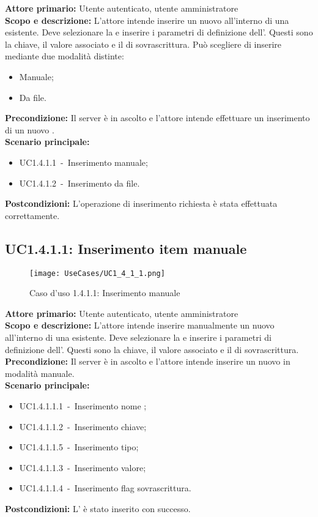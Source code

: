 \documentclass{scalatekids-article}
\begin{document}
\textbf{Attore primario:} Utente autenticato, utente amministratore\\
\textbf{Scopo e descrizione:} L'attore intende inserire un nuovo  all'interno di una  esistente. Deve selezionare la  e inserire i parametri di definizione dell'. Questi sono la chiave, il valore associato e il  di sovrascrittura. Può scegliere di inserire mediante due modalità distinte:
\begin{itemize}
\item Manuale;
\item Da file.
\end{itemize}
\textbf{Precondizione:} Il server è in ascolto e l'attore intende effettuare un inserimento di un nuovo .\\
\textbf{Scenario principale:}
\begin{itemize}
\item UC1.4.1.1\ -\ Inserimento  manuale;
\item UC1.4.1.2\ -\ Inserimento  da file.
\end{itemize}
\textbf{Postcondizioni:} L'operazione di inserimento richiesta è stata effettuata correttamente.

\subsection{UC1.4.1.1: Inserimento item manuale}

\begin{figure}[H]
  \begin{center}
    \texttt{[image: UseCases/UC1\_4\_1\_1.png]}
    \caption*{Caso d'uso 1.4.1.1: Inserimento  manuale}
  \end{center}
\end{figure}
\textbf{Attore primario:} Utente autenticato, utente amministratore\\
\textbf{Scopo e descrizione:} L'attore intende inserire manualmente un nuovo  all'interno di una  esistente. Deve selezionare la  e inserire i parametri di definizione dell'. Questi sono la chiave, il valore associato e il  di sovrascrittura.\\
\textbf{Precondizione:} Il server è in ascolto e l'attore intende inserire un nuovo  in modalità manuale.\\
\textbf{Scenario principale:}
\begin{itemize}
\item UC1.4.1.1.1\ -\ Inserimento nome ;
\item UC1.4.1.1.2\ -\ Inserimento chiave;
\item UC1.4.1.1.5\ -\ Inserimento tipo;
\item UC1.4.1.1.3\ -\ Inserimento valore;
\item UC1.4.1.1.4\ -\ Inserimento flag sovrascrittura.
\end{itemize}
\textbf{Postcondizioni:} L' è stato inserito con successo.
\end{document}

